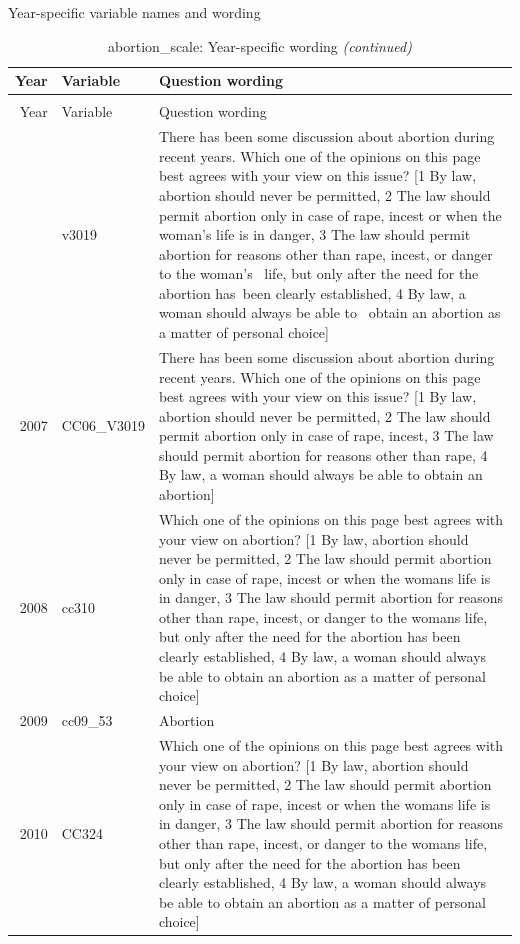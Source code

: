 \documentclass[12pt]{article}
\begin{document}
\endgroup{}

Year-specific variable names and wording

\begin{longtable}[t]{rl>{\raggedright\arraybackslash}p{10cm}}
\caption{\label{tab:unnamed-chunk-4}abortion\_scale: Year-specific wording}\\
\toprule
Year & Variable & Question wording\\
\midrule
\endfirsthead
\caption[]{abortion\_scale: Year-specific wording \textit{(continued)}}\\
\toprule
Year & Variable & Question wording\\
\midrule
\endhead
\
\endfoot
\bottomrule
\endlastfoot
2006 & v3019 & There has been some discussion about abortion during recent years.  Which one of the opinions on this page best agrees with your view on this issue? [1 By law, abortion should never be permitted, 2 The law should permit abortion only in case of rape, incest or when the woman's life is in danger, 3 The law should permit abortion for reasons other than rape, incest, or danger to the woman's  life, but only after the need for the abortion has been clearly established, 4 By law, a woman should always be able to  obtain an abortion as a matter of personal choice]\\
2007 & CC06\_V3019 & There has been some discussion about abortion during recent years. Which one of the opinions on this page best agrees with your view on this issue? [1 By law, abortion should never be permitted, 2 The law should permit abortion only in case of rape, incest, 3 The law should permit abortion for reasons other than rape, 4 By law, a woman should always be able to obtain an abortion]\\
2008 & cc310 & Which one of the opinions on this page best agrees with your view on abortion? [1 By law, abortion should never be permitted, 2 The law should permit abortion only in case of rape, incest or when the womans life is in danger, 3 The law should permit abortion for reasons other than rape, incest, or danger to the womans life, but only after the need for the abortion has been clearly established, 4 By law, a woman should always be able to obtain an abortion as a matter of personal choice]\\
2009 & cc09\_53 & Abortion\\
2010 & CC324 & Which one of the opinions on this page best agrees with your view on abortion? [1 By law, abortion should never be permitted, 2 The law should permit abortion only in case of rape, incest or when the womans life is in danger, 3 The law should permit abortion for reasons other than rape, incest, or danger to the womans life, but only after the need for the abortion has been clearly established, 4 By law, a woman should always be able to obtain an abortion as a matter of personal choice]\\

\end{longtable}
\end{document}
